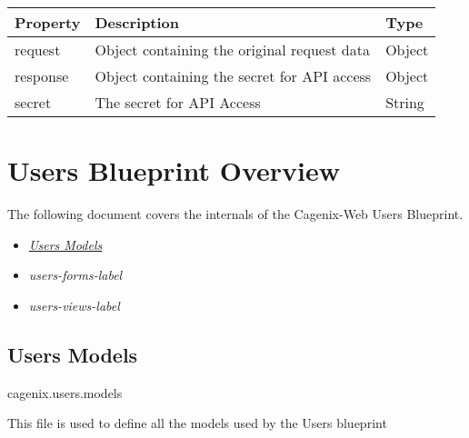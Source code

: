 \documentclass[letterpaper,10pt,english]{sphinxmanual}
\begin{document}
\begin{tabulary}{\linewidth}{|L|L|L|}
\hline
\textsf{\relax 
Property
} & \textsf{\relax 
Description
} & \textsf{\relax 
Type
}\\
\hline
request
 & 
Object containing the original
request data
 & 
Object
\\

response
 & 
Object containing the secret for
API access
 & 
Object
\\

secret
 & 
The secret for API Access
 & 
String
\\
\hline\end{tabulary}



\chapter{Users Blueprint Overview}
\label{dev-users::doc}\label{dev-users:users-blueprint-overview}
The following document covers the internals of the Cagenix-Web Users
Blueprint.
\begin{itemize}
\item {} 
{\hyperref[dev-users:users-models-label]{\emph{Users Models}}}

\item {} 
\emph{users-forms-label}

\item {} 
\emph{users-views-label}

\end{itemize}


\section{Users Models}
\label{dev-users:users-models-label}\label{dev-users:module-cagenix.users.models}\label{dev-users:users-models}
cagenix.users.models

This file is used to define all the models used by the Users blueprint
\end{document}

